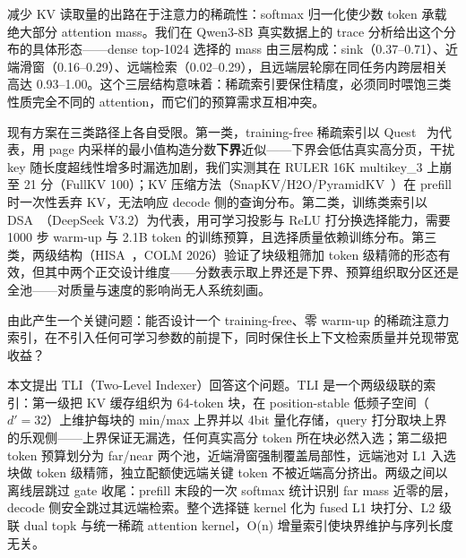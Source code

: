 \documentclass[11pt]{article}
\begin{document}
减少 KV 读取量的出路在于注意力的稀疏性：softmax 归一化使少数 token 承载绝大部分 attention mass。我们在 Qwen3-8B 真实数据上的 trace 分析给出这个分布的具体形态——dense top-1024 选择的 mass 由三层构成：sink（0.37--0.71）、近端滑窗（0.16--0.29）、远端检索（0.02--0.29），且远端层轮廓在同任务内跨层相关高达 0.93--1.00。这个三层结构意味着：稀疏索引要保住精度，必须同时喂饱三类性质完全不同的 attention，而它们的预算需求互相冲突。

现有方案在三类路径上各自受限。第一类，training-free 稀疏索引以 Quest~\cite{quest} 为代表，用 page 内采样的最小值构造分数\textbf{下界}近似——下界会低估真实高分页，干扰 key 随长度超线性增多时漏选加剧，我们实测其在 RULER 16K multikey\_3 上崩至 21 分（FullKV 100）；KV 压缩方法（SnapKV/H2O/PyramidKV~\cite{snapkv,h2o,pyramidkv}）在 prefill 时一次性丢弃 KV，无法响应 decode 侧的查询分布。第二类，训练类索引以 DSA~\cite{dsa}（DeepSeek V3.2）为代表，用可学习投影与 ReLU 打分换选择能力，需要 1000 步 warm-up 与 2.1B token 的训练预算，且选择质量依赖训练分布。第三类，两级结构（HISA~\cite{hisa}，COLM 2026）验证了块级粗筛加 token 级精筛的形态有效，但其中两个正交设计维度——分数表示取上界还是下界、预算组织取分区还是全池——对质量与速度的影响尚无人系统刻画。

由此产生一个关键问题：能否设计一个 training-free、零 warm-up 的稀疏注意力索引，在不引入任何可学习参数的前提下，同时保住长上下文检索质量并兑现带宽收益？

本文提出 TLI（Two-Level Indexer）回答这个问题。TLI 是一个两级级联的索引：第一级把 KV 缓存组织为 64-token 块，在 position-stable 低频子空间（$d'{=}32$）上维护每块的 min/max 上界并以 4bit 量化存储，query 打分取块上界的乐观侧——上界保证无漏选，任何真实高分 token 所在块必然入选；第二级把 token 预算划分为 far/near 两个池，近端滑窗强制覆盖局部性，远端池对 L1 入选块做 token 级精筛，独立配额使远端关键 token 不被近端高分挤出。两级之间以离线层跳过 gate 收尾：prefill 末段的一次 softmax 统计识别 far mass 近零的层，decode 侧安全跳过其远端检索。整个选择链 kernel 化为 fused L1 块打分、L2 级联 dual topk 与统一稀疏 attention kernel，O(n) 增量索引使块界维护与序列长度无关。
\end{document}
